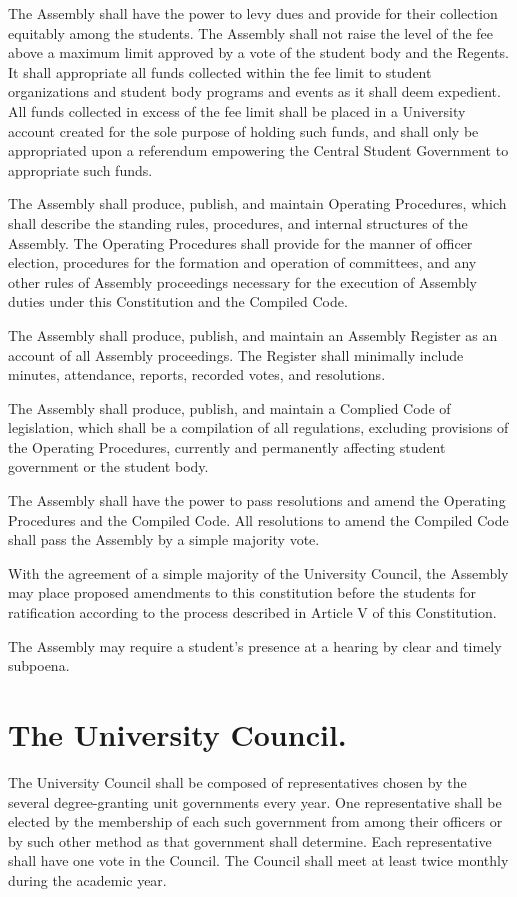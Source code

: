      The Assembly shall have the power to levy dues and provide for their collection equitably among the students. The Assembly shall not raise the level of the fee above a maximum limit approved by a vote of the student body and the Regents. It shall appropriate all funds collected within the fee limit to student organizations and student body programs and events as it shall deem expedient. All funds collected in excess of the fee limit shall be placed in a University account created for the sole purpose of holding such funds, and shall only be appropriated upon a referendum empowering the Central Student Government to appropriate such funds. 

    The Assembly shall produce, publish, and maintain Operating Procedures, which shall describe the standing rules, procedures, and internal structures of the Assembly. The Operating Procedures shall provide for the manner of officer election, procedures for the formation and operation of committees, and any other rules of Assembly proceedings necessary for the execution of Assembly duties under this Constitution and the Compiled Code.

    The Assembly shall produce, publish, and maintain an Assembly Register as an account of all Assembly proceedings. The Register shall minimally include minutes, attendance, reports, recorded votes, and resolutions.

    The Assembly shall produce, publish, and maintain a Complied Code of legislation, which shall be a compilation of all regulations, excluding provisions of the Operating Procedures, currently and permanently affecting student government or the student body.

     The Assembly shall have the power to pass resolutions and amend the Operating Procedures and the Compiled Code. All resolutions to amend the Compiled Code shall pass the Assembly by a simple majority vote.

     With the agreement of a simple majority of the University Council, the Assembly may place proposed amendments to this constitution before the students for ratification according to the process described in Article V of this Constitution.

    The Assembly may require a student's presence at a hearing by clear and timely subpoena.

\section{The University Council.}
    The University Council shall be composed of representatives chosen by the several degree-granting unit governments every year. One representative shall be elected by the membership of each such government from among their officers or by such other method as that government shall determine. Each representative shall have one vote in the Council. The Council shall meet at least twice monthly during the academic year.

